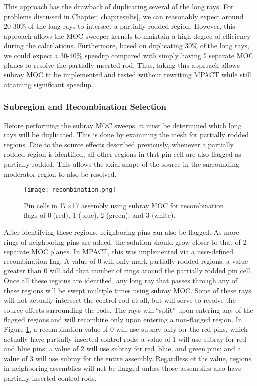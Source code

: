 This approach has the drawback of duplicating several of the long rays.  For problems discussed in Chapter \ref{chap:results}, we can reasonably expect around 20-30\% of the long rays to intersect a partially rodded region.  However, this approach allows the MOC sweeper kernels to maintain a high degree of efficiency during the calculations.  Furthermore, based on duplicating 30\% of the long rays, we could expect a 30-40\% speedup compared with simply having 2 separate MOC planes to resolve the partially inserted rod.  Thus, taking this approach allows subray MOC to be implemented and tested without rewriting MPACT while still attaining significant speedup.

\subsubsection{Subregion and Recombination Selection}\label{sss:recombination}

Before performing the subray MOC sweeps, it must be determined which long rays will be duplicated.  This is done by examining the mesh for partially rodded regions.  Due to the source effects described previously, whenever a partially rodded region is identified, all other regions in that pin cell are also flagged as partially rodded.  This allows the axial shape of the source in the surrounding moderator region to also be resolved.

\begin{figure}
    \centering
    \texttt{[image: recombination.png]}
    \caption{Pin cells in 17$\times$17 assembly using subray MOC for recombination flags of 0 (red), 1 (blue), 2 (green), and 3 (white).}\label{f:recombination}
\end{figure}

After identifying these regions, neighboring pins can also be flagged.  As more rings of neighboring pins are added, the solution should grow closer to that of 2 separate MOC planes.  In MPACT, this was implemented via a user-defined recombination flag.  A value of 0 will only mark partially rodded regions; a value greater than 0 will add that number of rings around the partially rodded pin cell.  Once all these regions are identified, any long ray that passes through any of these regions will be swept multiple times using subray MOC.  Some of these rays will not actually intersect the control rod at all, but will serve to resolve the source effects surrounding the rods.  The rays will ``split'' upon entering any of the flagged regions and will recombine only upon entering a non-flagged region.  In Figure \ref{f:recombination}, a recombination value of 0 will use subray only for the red pins, which actually have partially inserted control rods; a value of 1 will use subray for red and blue pins; a value of 2 will use subray for red, blue, and green pins; and a value of 3 will use subray for the entire assembly.  Regardless of the value, regions in neighboring assemblies will not be flagged unless those assemblies also have partially inserted control rods.


